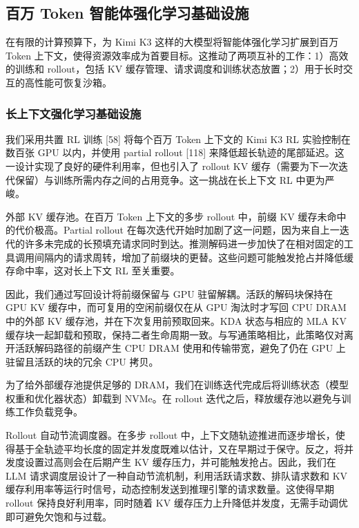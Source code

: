 \documentclass[
  10
]{article}
\begin{document}
\subsection{百万 Token 智能体强化学习基础设施}\label{infra-for-1m-agentic-rl}

在有限的计算预算下，为 Kimi K3 这样的大模型将智能体强化学习扩展到百万 Token 上下文，使得资源效率成为首要目标。这推动了两项互补的工作：1）高效的训练和 rollout，包括 KV 缓存管理、请求调度和训练状态放置；2）用于长时交互的高性能可恢复沙箱。

\subsubsection{长上下文强化学习基础设施}\label{long-context-rl-infrastructure}

我们采用共置 RL 训练 {[}58{]} 将每个百万 Token 上下文的 Kimi K3 RL 实验控制在数百张 GPU 以内，并使用 partial rollout {[}118{]} 来降低超长轨迹的尾部延迟。这一设计实现了良好的硬件利用率，但也引入了 rollout KV 缓存（需要为下一次迭代保留）与训练所需内存之间的占用竞争。这一挑战在长上下文 RL 中更为严峻。

外部 KV 缓存池。在百万 Token 上下文的多步 rollout 中，前缀 KV 缓存未命中的代价极高。Partial rollout 在每次迭代开始时加剧了这一问题，因为来自上一迭代的许多未完成的长预填充请求同时到达。推测解码进一步加快了在相对固定的工具调用间隔内的请求周转，增加了前缀块的更替。这些问题可能触发抢占并降低缓存命中率，这对长上下文 RL 至关重要。

因此，我们通过写回设计将前缀保留与 GPU 驻留解耦。活跃的解码块保持在 GPU KV 缓存中，而可复用的空闲前缀仅在从 GPU 淘汰时才写回 CPU DRAM 中的外部 KV 缓存池，并在下次复用前预取回来。KDA 状态与相应的 MLA KV 缓存块一起卸载和预取，保持二者生命周期一致。与写通策略相比，此策略仅对离开活跃解码路径的前缀产生 CPU DRAM 使用和传输带宽，避免了仍在 GPU 上驻留且活跃的块的冗余 CPU 拷贝。

为了给外部缓存池提供足够的 DRAM，我们在训练迭代完成后将训练状态（模型权重和优化器状态）卸载到 NVMe。在 rollout 迭代之后，释放缓存池以避免与训练工作负载竞争。

Rollout 自动节流调度器。在多步 rollout 中，上下文随轨迹推进而逐步增长，使得基于全轨迹平均长度的固定并发度既难以估计，又在早期过于保守。反之，将并发度设置过高则会在后期产生 KV 缓存压力，并可能触发抢占。因此，我们在 LLM 请求调度层设计了一种自动节流机制，利用活跃请求数、排队请求数和 KV 缓存利用率等运行时信号，动态控制发送到推理引擎的请求数量。这使得早期 rollout 保持良好利用率，同时随着 KV 缓存压力上升降低并发度，无需手动调优即可避免欠饱和与过载。
\end{document}
